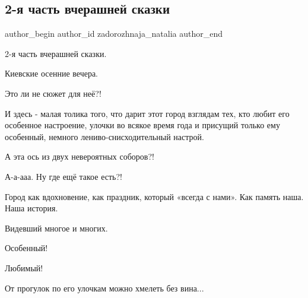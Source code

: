  
 
 
 
 
 
\subsection{2-я часть вчерашней сказки}
\label{sec:19_11_2021.fb.zadorozhnaja_natalia.2.skazka_sofia_2}
 
\ifcmt
 author_begin
   author_id zadorozhnaja_natalia
 author_end
\fi

2-я часть вчерашней сказки.

Киевские осенние вечера.

Это ли не сюжет для неё?!


И здесь - малая толика того, что дарит этот город взглядам тех, кто любит его
особенное настроение, улочки во всякое время года и присущий только ему
особенный, немного лениво-снисходительный настрой.

А эта ось из двух невероятных соборов?!

А-а-ааа. Ну где ещё такое есть?!

Город как вдохновение, как праздник, который «всегда с нами». Как память наша.
Наша история.

Видевший многое и многих. 

Особенный!

Любимый!

От прогулок по его улочкам можно хмелеть без вина...
